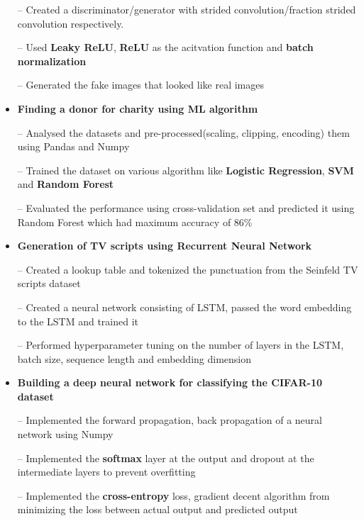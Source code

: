 \documentclass{article}
\begin{document}
\begin{itemize}
\item[--] Created a  discriminator/generator with strided convolution/fraction strided convolution respectively.
\item[--] Used \textbf{Leaky ReLU}, \textbf{ReLU} as the acitvation function and \textbf{batch normalization}
\item[--] Generated the fake images that looked like real images



\item \textbf{Finding a donor for charity using ML algorithm } %


\item[--] Analysed the datasets and pre-processed(scaling, clipping, encoding) them using Pandas and Numpy
\item[--] Trained the dataset on various algorithm like \textbf{Logistic Regression}, \textbf{SVM} and \textbf{Random Forest}
\item[--]  Evaluated the performance using cross-validation set and predicted it using Random Forest which had maximum accuracy of 86\%


\item \textbf{Generation of TV scripts using Recurrent Neural Network } %
 \item[--] Created a lookup table and tokenized the punctuation from the Seinfeld TV scripts dataset
 \item[--] Created a neural network consisting of LSTM, passed the word embedding to the LSTM and trained it
 \item[--] Performed hyperparameter tuning on the number of layers in the LSTM, batch size, sequence length and embedding dimension 
 
 
\item \textbf{Building a deep neural network for classifying the CIFAR-10 dataset}  %
 \item[--] Implemented the forward propagation, back propagation of a neural network using Numpy
 \item[--] Implemented the \textbf{softmax} layer at the output and dropout at the intermediate layers to prevent overfitting
 \item[--] Implemented the \textbf{cross-entropy} loss, gradient decent algorithm from minimizing the loss between actual output and predicted output
 




\end{itemize}
\end{document}
